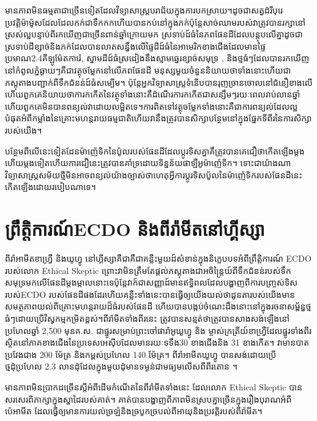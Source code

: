 \documentclass[10pt,twocolumn,letterpaper]{article}
\begin{document}
មានភាពមិនធម្មតាជាច្រើនទៀតដែលវិទ្យាសាស្ត្របរាជ័យក្នុងការបកស្រាយ។​ដូចជាសត្វដំរីបុរេប្រវត្តិម៉ាម៉ូសដែលដែលកក់ជាទឹកកកហើយបានកប់នៅក្នុងភក់ប៉ុន្តែសាច់ឈាមរបស់វាត្រូវបានរក្សានៅស្រស់ល្អបន្ទាប់ពីរកឃើញជាច្រើនពាន់ឆ្នាំក្រោយមក \cite{17,18,19} ស្រទាប់ដ៍ធំនៃភពផែនដីដែលបន្តុបលើគ្នាដូចជាស្រទាប់ដី​ខ្សាច់​និង​ភក់ដែលបានលាតសន្ធឹងលើផ្ទៃដីដ៍ធំនៃអាមេរិកខាងជើងដែលមានផ្ទៃប្រមាណ2.4គីឡូម៉ែតការ៉េ\cite{21}, ស្នាមដីដ៍ធំស្រដៀងនឹងស្មាមឆ្នេរខ្សាច់សមុទ្រ \cite{22}, និងថ្មធំៗដែលបានរកឃើញនៅកំពូលភ្នំឆ្ងាយៗគឺជាវត្ថុចម្លែកនៅលើភពផែនដី \cite{23,26}​មនុស្សមួយចំនួននិយាយថាទាំងនោះហើយជាភស្តុតាងបញ្ជាក់ពីទឹកជំនន់ដ៍ធំសម្បើម។ ប៉ុន្តែអ្នកវិទ្យាសាស្ត្រទំនើបបានរុញច្រានចោលនៅជំនឿខាងលើ​ហើយពួកគេនិយាយថាការកកើតនៃវត្ថុទាំងនោះគឺដំណើរការកកើតជាសន្សឹមៗរយៈពេលរាប់លានឆ្នាំ​ហើយពួកគេមិនបានពន្យល់វាដោយលម្អិតទេ។​ការពិតទៅវត្ថុចម្លែកទាំងនោះគឺជាការពន្យល់ដែលល្អបំផុតអំពីកម្លាំងនៃគ្រោះមហន្តរាយធម្មជាតិ​ហើយវានឹងត្រូវបានសិក្សាបន្ថែមនៅក្នុងផ្នែកទីពីរនៃការសិក្សារបស់យើង។

បន្ថែមពីលើនេះទៀត​ដែនម៉ាញ៉េទិកនៃប៉ូលរបស់ផែនដីដែលប្តូរទិសគ្នា​គឹត្រូវបានគេជឿថាកើតឡើងម្តងហើយម្តងទៀត​ហើយការជឿនេះត្រូវបានគាំទ្រដោយទិន្នន័យផាឡឺអូម៉ាញ៉េទិក​ \cite{35,40,41}។ ទោះជាយ៉ាងណា វិទ្យាសាស្ត្រសម័យថ្មីមិនអាចពន្យល់យ៉ាងច្បាស់ថាហេតុអ្វីការប្តូរទិសប៉ូលនៃម៉ាញ៉េទិករបស់ផែនដីនេះកើតឡើងដោយរបៀបណាទេ។

\section{ព្រឹត្តិការណ៍ECDO និងពីរ៉ាមីតនៅហ្គីស្សា}

ពីរ៉ាអាមីតខាហ្វ្រឺ និងឃូហ្វូ នៅហ្គីស្សាគឺជាគឺជាគន្លឺះមួយដ៍សំខាន់ក្នុងនិក្ខេបបទអំពីព្រឹត្តិការណ៍ ECDO របស់លោក Ethical Skeptic \cite{27} ព្រោះវាមិនត្រឹមតែផ្តល់ភស្តុតាងជាអចិន្ត្រៃយ៍ពីទឹកជំនន់របស់ទឹកសមុទ្រមកលើផែនដីម្តងម្កាលនោះទេប៉ុន្តែវាក៍ជាសញ្ញាដ៍មានឥទ្ធិពលដែលបង្ហាញពីការបញ្ច្រស់ទិសរបស់​ECDO របស់ផែនដីផងដែរ​ហើយគន្លឺះទាំងនេះបានធ្វើឲ្យយើងយល់ថាដូនតារបស់យើងមានសមត្ថភាពយល់ពីគ្រោះមហន្តរាយដ៏ធំរបស់ផែនដី ហើយបានបង្កប់ចំណេះដឹងនោះនៅក្នុងរចនាសម្ព័ន្ធថ្មធំៗដោយប្រើវិស្វកម្មកម្រិតខ្ពស់។ពីរ៉ាមីតទាំងពីរនេះ ត្រូវបានសន្មត់ថាត្រូវបានសាងសង់ឡើងនៅប្រហែលឆ្នាំ 2,500 មុនគ.ស. ជាផ្នូរសម្រាប់ព្រះចៅផារ៉ាអូឃូហ្វូ និង ម្ចាស់ក្រត្រីយ៍ខាហ្វ្រឺដែលផ្នូរទាំងពីរស្ថិតនៅភាគខាងជើងនៃប្រទេសអេស៊ីបដែលមានរយៈទទឹង​30 ខាងជើងនិង 31 ខាងកើត។ វាមានបាតប្រវែងជាង 200 ម៉ែត្រ និងកម្ពស់ប្រហែល 140 ម៉ែត្រ។ ពីរ៉ាអាមីតឃូហ្វូ បានសង់ដោយប្រើថ្មដុំប្រហែល 2.3 លានដុំដែលក្នុងមួយដុំមានទម្ងន់ជាមធ្យមលើសពីពីរតោន \cite{24, 25}។

មានភាពមិនប្រាកដច្រើនស្ដីអំពីដើមកំណើតនៃពីរ៉ាមីតទាំងនេះ ដែលលោក Ethical Skeptic បានសរសេរពិភាក្សាក្នុងស្នាដៃរបស់គាត់។ គាត់បានបង្ហាញពីភាពមិនស្របគ្នាច្រើនក្នុងរឿងបុរាណអំពីប៉េអាមីត ដែលធ្វើឲ្យមានការយល់ច្រឡំ​និង​ច្របូកច្របល់ពីអាយុនិងប្រវត្តិរបស់ពីរ៉ាមីត។
\end{document}
